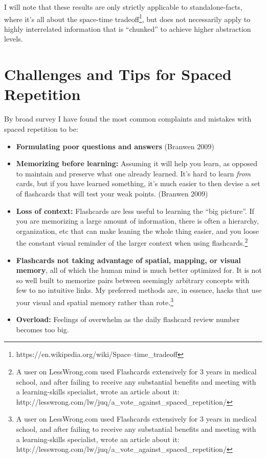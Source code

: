 I will note that these results are only strictly applicable to
standalone-facts, where it's all about the space-time tradeoff\footnote{https://en.wikipedia.org/wiki/Space--time\_tradeoff},
but does not necessarily apply to highly interrelated information that
is ``chunked'' to achieve higher abstraction levels.

\pagebreak

\section{Challenges and Tips for Spaced
Repetition}\label{challenges-and-tips-for-spaced-repetition}

By broad survey I have found the most common complaints and mistakes
with spaced repetition to be:

\begin{itemize}
\item
  \textbf{Formulating poor questions and answers} (Branwen 2009)
\item
  \textbf{Memorizing before learning:} Assuming it will help you learn,
  as opposed to maintain and preserve what one already learned. It's
  hard to learn \emph{from} cards, but if you have learned something,
  it's much easier to then devise a set of flashcards that will test
  your weak points. (Branwen 2009)
\item
  \textbf{Loss of context:} Flashcards are less useful to learning the
  ``big picture''. If you are memorizing a large amount of information,
  there is often a hierarchy, organization, etc that can make leaning
  the whole thing easier, and you loose the constant visual reminder of
  the larger context when using flashcards.\footnote{A user on
    LessWrong.com used Flashcards extensively for 3 years in medical
    school, and after failing to receive any substantial benefits and
    meeting with a learning-skills specialist, wrote an article about
    it:
    http://lesswrong.com/lw/juq/a\_vote\_against\_spaced\_repetition/}
\item
  \textbf{Flashcards not taking advantage of spatial, mapping, or visual
  memory}, all of which the human mind is much better optimized for. It
  is not so well built to memorize pairs between seemingly arbitrary
  concepts with few to no intuitive links. My preferred methods are, in
  essence, hacks that use your visual and spatial memory rather than
  rote.\footnote{A user on LessWrong.com used Flashcards extensively for
    3 years in medical school, and after failing to receive any
    substantial benefits and meeting with a learning-skills specialist,
    wrote an article about it:
    http://lesswrong.com/lw/juq/a\_vote\_against\_spaced\_repetition/}
\item
  \textbf{Overload:} Feelings of overwhelm as the daily flashcard review
  number becomes too big.
\end{itemize}

